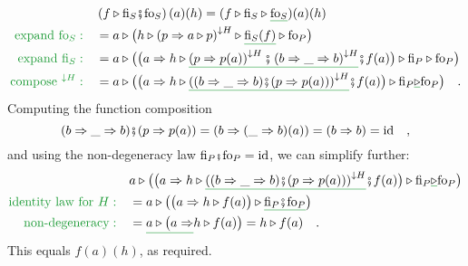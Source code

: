 \begin{align*}
\quad & \left(f\triangleright\text{fi}_{S}\bef\text{fo}_{S}\right)(a)(h)=(f\triangleright\text{fi}_{S}\triangleright\gunderline{\text{fo}_{S}})(a)(h)\\
{\color{greenunder}\text{expand }\text{fo}_{S}:}\quad & =a\triangleright\big(h\triangleright\left(p\Rightarrow a\triangleright p\right)^{\downarrow H}\triangleright\gunderline{\text{fi}_{S}(f)}\triangleright\text{fo}_{P}\big)\\
{\color{greenunder}\text{expand }\text{fi}_{S}:}\quad & =a\triangleright\big(\big(a\Rightarrow h\triangleright\gunderline{\left(p\Rightarrow p(a)\right)^{\downarrow H}\bef\left(b\Rightarrow\_\Rightarrow b\right)^{\downarrow H}}\bef f(a)\big)\triangleright\text{fi}_{P}\triangleright\text{fo}_{P}\big)\\
{\color{greenunder}\text{compose }^{\downarrow H}:}\quad & =a\triangleright\big(\big(a\Rightarrow h\triangleright\gunderline{\left((b\Rightarrow\_\Rightarrow b)\bef(p\Rightarrow p(a))\right)^{\downarrow H}}\bef f(a)\big)\triangleright\text{fi}_{P}\gunderline{\triangleright}\text{fo}_{P}\big)\quad.
\end{align*}
Computing the function composition
\[
(b\Rightarrow\_\Rightarrow b)\bef(p\Rightarrow p(a))=(b\Rightarrow(\_\Rightarrow b)(a))=(b\Rightarrow b)=\text{id}\quad,
\]
and using the non-degeneracy law $\text{fi}_{P}\bef\text{fo}_{P}=\text{id}$,
we can simplify further:
\begin{align*}
 & a\triangleright\big(\big(a\Rightarrow h\triangleright\gunderline{\left((b\Rightarrow\_\Rightarrow b)\bef(p\Rightarrow p(a))\right)^{\downarrow H}}\bef f(a)\big)\triangleright\text{fi}_{P}\gunderline{\triangleright}\text{fo}_{P}\big)\\
{\color{greenunder}\text{identity law for }H:}\quad & =a\triangleright\big(\big(a\Rightarrow h\triangleright f(a)\big)\triangleright\gunderline{\text{fi}_{P}\bef\text{fo}_{P}}\big)\\
{\color{greenunder}\text{non-degeneracy}:}\quad & =\gunderline{a\triangleright\big(a\Rightarrow}h\triangleright f(a)\big)=h\triangleright f(a)\quad.
\end{align*}
This equals $f(a)(h)$, as required.%
